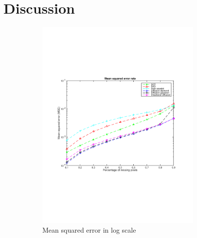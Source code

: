 \section{Discussion}
\label{sec:discussion}

\begin{figure}
	\centering
	\begin{subfigure}[b]{0.49\textwidth}
		\centering
		\includegraphics[clip, trim=2cm 7cm 2cm 6cm, width=0.9\textwidth]{figures/mse_vector}
		\caption{Mean squared error in log scale}
		\label{fig:err_random}
	\end{subfigure}
	\begin{subfigure}[b]{0.49\textwidth}
		\centering

\end{subfigure}
\end{figure}
